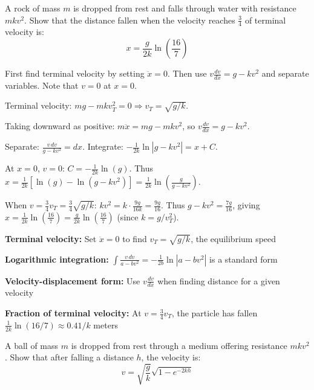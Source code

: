 \begin{problem}
A rock of mass $m$ is dropped from rest and falls through water with resistance $mkv^2$. Show that the distance fallen when the velocity reaches $\frac{3}{4}$ of terminal velocity is:
\[
x = \frac{g}{2k} \ln\left(\frac{16}{7}\right)
\]
\end{problem}

\begin{hint}
First find terminal velocity by setting $\ddot{x} = 0$. Then use $v\frac{dv}{dx} = g - kv^2$ and separate variables. Note that $v = 0$ at $x = 0$.
\end{hint}

\begin{solution}
Terminal velocity: $mg - mkv_T^2 = 0 \Rightarrow v_T = \sqrt{g/k}$.

Taking downward as positive: $m\ddot{x} = mg - mkv^2$, so $v\frac{dv}{dx} = g - kv^2$.

Separate: $\frac{v\,dv}{g - kv^2} = dx$. Integrate: $-\frac{1}{2k}\ln|g - kv^2| = x + C$.

At $x = 0$, $v = 0$: $C = -\frac{1}{2k}\ln(g)$. Thus $x = \frac{1}{2k}\left[\ln(g) - \ln(g - kv^2)\right] = \frac{1}{2k}\ln\left(\frac{g}{g - kv^2}\right)$.

When $v = \frac{3}{4}v_T = \frac{3}{4}\sqrt{g/k}$: $kv^2 = k \cdot \frac{9g}{16k} = \frac{9g}{16}$. Thus $g - kv^2 = \frac{7g}{16}$, giving $x = \frac{1}{2k}\ln\left(\frac{16}{7}\right) = \frac{g}{2k}\ln\left(\frac{16}{7}\right)$ (since $k = g/v_T^2$).
\end{solution}

\begin{takeaways}
\item \textbf{Terminal velocity:} Set $\ddot{x} = 0$ to find $v_T = \sqrt{g/k}$, the equilibrium speed
\item \textbf{Logarithmic integration:} $\int \frac{v\,dv}{a - bv^2} = -\frac{1}{2b}\ln|a - bv^2|$ is a standard form
\item \textbf{Velocity-displacement form:} Use $v\frac{dv}{dx}$ when finding distance for a given velocity
\item \textbf{Fraction of terminal velocity:} At $v = \frac{3}{4}v_T$, the particle has fallen $\frac{1}{2k}\ln(16/7) \approx 0.41/k$ meters
\end{takeaways}

\begin{problem}
A ball of mass $m$ is dropped from rest through a medium offering resistance $mkv^2$. Show that after falling a distance $h$, the velocity is:
\[
v = \sqrt{\frac{g}{k}}\sqrt{1 - e^{-2kh}}
\]
\end{problem}

